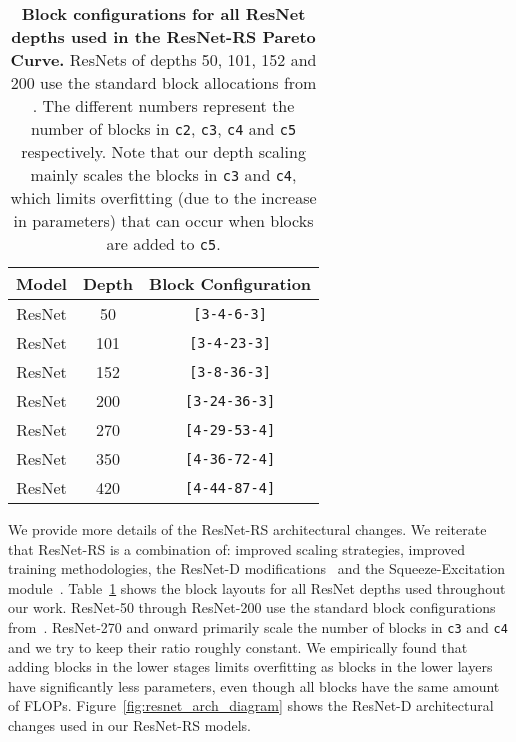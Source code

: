 \documentclass{article}
\begin{document}
\begin{table}[h!]
\begin{center}
\begin{tabular}{ccc}
  \toprule
  Model & Depth & Block Configuration   \\
  \hline
  ResNet & 50 & \texttt{[3-4-6-3]}\\
  ResNet & 101 & \texttt{[3-4-23-3]}\\
  ResNet & 152 & \texttt{[3-8-36-3]}\\ 

  ResNet & 200 & \texttt{[3-24-36-3]}\\ 
  ResNet & 270 & \texttt{[4-29-53-4]}\\
  ResNet & 350 & \texttt{[4-36-72-4]}\\
  ResNet & 420 & \texttt{[4-44-87-4]}\\
  \bottomrule
\end{tabular}
\end{center}
\caption{\textbf{Block configurations for all ResNet depths used in the ResNet-RS Pareto Curve.} ResNets of depths 50, 101, 152 and 200 use the standard block allocations from \citet{resnet}. The different numbers represent the number of blocks in \texttt{c2}, \texttt{c3}, \texttt{c4} and \texttt{c5} respectively. Note that our depth scaling mainly scales the blocks in \texttt{c3} and \texttt{c4}, which limits overfitting (due to the increase in parameters) that can occur when blocks are added to \texttt{c5}.}
\label{tab:block_config_details} 
\end{table}

We provide more details of the ResNet-RS architectural changes. 
We reiterate that ResNet-RS is a combination of: improved scaling strategies, improved training methodologies, the ResNet-D modifications~\cite{he2019bag} and the Squeeze-Excitation module~\cite{hu2018squeeze}.
Table~\ref{tab:block_config_details} shows the block layouts for all ResNet depths used throughout our work. ResNet-50 through ResNet-200 use the standard block configurations from~\citet{resnet}. 
ResNet-270 and onward primarily scale the number of blocks in \texttt{c3} and \texttt{c4} and we try to keep their ratio roughly constant. 
We empirically found that adding blocks in the lower stages limits overfitting as blocks in the lower layers have significantly less parameters, even though all blocks have the same amount of FLOPs. Figure~\ref{fig:resnet_arch_diagram} shows the ResNet-D architectural changes used in our ResNet-RS models.
\end{document}
